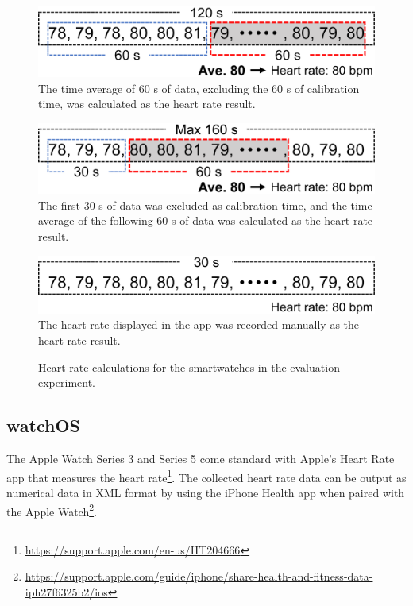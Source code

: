 \begin{figure}[!t]
  \centering
  \begin{minipage}[t]{1\linewidth}
    \centering
    \includegraphics[width=1\linewidth]{figures/calculating_wearos.eps}
    \small The time average of 60 s of data, excluding the 60 s of calibration time, was calculated as the heart rate result.
    \label{fig:calculating_wearos}
    \vspace{10pt}
  \end{minipage}
  \begin{minipage}[t]{1\linewidth}
    \centering
    \includegraphics[width=1\linewidth]{figures/calculating_watchos.eps}
    \small The first 30 s of data was excluded as calibration time, and the time average of the following 60 s of data was calculated as the heart rate result.
    \label{fig:calculating_watchos}
    \vspace{10pt}
  \end{minipage}
  \begin{minipage}[t]{1\linewidth}
    \centering
    \includegraphics[width=1\linewidth]{figures/calculating_smartos.eps}
    \small The heart rate displayed in the app was recorded manually as the heart rate result.
    \label{fig:calculating_smartos}
  \end{minipage}
  \caption{Heart rate calculations for the smartwatches in the evaluation experiment.}
  \label{fig:calculating_heart_rate}
\end{figure}

\subsection{watchOS}
The Apple Watch Series 3 and Series 5 come standard with Apple's Heart Rate app that measures the heart rate\footnote{\url{https://support.apple.com/en-us/HT204666}}. The collected heart rate data can be output as numerical data in XML format by using the iPhone Health app when paired with the Apple Watch\footnote{\url{https://support.apple.com/guide/iphone/share-health-and-fitness-data-iph27f6325b2/ios}}.\par

